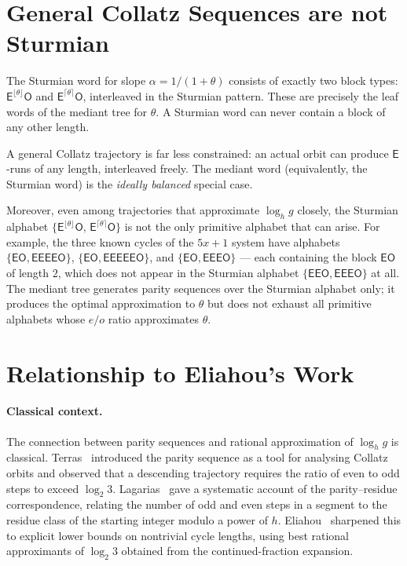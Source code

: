 \documentclass[12pt]{article}
\theoremstyle{definition}
\theoremstyle{remark}
\theoremstyle{plain}
\newcommand{\OO}{\mathsf{O}}
\newcommand{\EE}{\mathsf{E}}
\begin{document}
\section{General Collatz Sequences are not Sturmian}
\label{sec:not-sturmian}

The Sturmian word for slope $\alpha = 1/(1+\theta)$ consists of exactly two block
types: $\EE^{\lfloor\theta\rfloor}\OO$ and $\EE^{\lceil\theta\rceil}\OO$,
interleaved in the Sturmian pattern.
These are precisely the leaf words of the mediant tree for $\theta$.
A Sturmian word can never contain a block of any other length.

A general Collatz trajectory is far less constrained: an actual orbit can produce
$\EE$-runs of any length, interleaved freely.
The mediant word (equivalently, the Sturmian word) is the \emph{ideally balanced}
special case.

Moreover, even among trajectories that approximate $\log_h g$ closely, the
Sturmian alphabet $\{\EE^{\lfloor\theta\rfloor}\OO,\, \EE^{\lceil\theta\rceil}\OO\}$
is not the only primitive alphabet that can arise.
For example, the three known cycles of the $5x+1$ system have alphabets
$\{\EE\OO, \EE\EE\EE\EE\OO\}$, $\{\EE\OO, \EE\EE\EE\EE\EE\OO\}$, and
$\{\EE\OO, \EE\EE\EE\OO\}$ --- each containing the block $\EE\OO$ of length $2$,
which does not appear in the Sturmian alphabet $\{\EE\EE\OO, \EE\EE\EE\OO\}$ at
all.
The mediant tree generates parity sequences over the Sturmian alphabet only; it
produces the optimal approximation to $\theta$ but does not exhaust all primitive
alphabets whose $e/o$ ratio approximates $\theta$.

\section{Relationship to Eliahou's Work}
\label{sec:eliahou}

\paragraph{Classical context.}
The connection between parity sequences and rational approximation of $\log_h g$ is
classical.
Terras~\cite{terras1976} introduced the parity sequence as a tool for analysing Collatz
orbits and observed that a descending trajectory requires the ratio of even to odd steps
to exceed $\log_2 3$.
Lagarias~\cite{lagarias1985} gave a systematic account of the parity--residue
correspondence, relating the number of odd and even steps in a segment to the
residue class of the starting integer modulo a power of $h$.
Eliahou~\cite{eliahou1993} sharpened this to explicit lower bounds on nontrivial cycle
lengths, using best rational approximants of $\log_2 3$ obtained from the
continued-fraction expansion.
\end{document}

